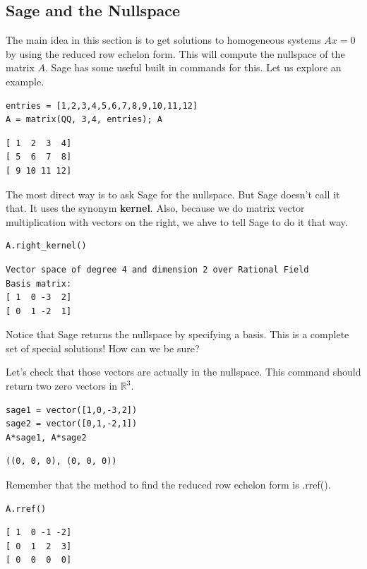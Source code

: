 \documentclass[10pt,]{book}
\newcommand{\terminology}[1]{\textbf{#1}}
\theoremstyle{plain}
\numberwithin{equation}{section}
\begin{document}
\subsection[Sage and the Nullspace]{Sage and the Nullspace}\label{subsection-66}

      The main idea in this section is to get solutions to homogeneous
      systems \(Ax=0\) by using the reduced row echelon form. This will
      compute the nullspace of the matrix \(A\). Sage has some useful built
      in commands for this. Let us explore an example.
\begin{lstlisting}[style=sageinput]
entries = [1,2,3,4,5,6,7,8,9,10,11,12]
A = matrix(QQ, 3,4, entries); A
\end{lstlisting}
\begin{lstlisting}[style=sageoutput]
[ 1  2  3  4]
[ 5  6  7  8]
[ 9 10 11 12]
\end{lstlisting}
\par

      The most direct way is to ask Sage for the nullspace. But Sage doesn't
      call it that. It uses the synonym \terminology{kernel}. Also, because we
      do matrix vector multiplication with vectors on the right, we ahve to
      tell Sage to do it that way.
\begin{lstlisting}[style=sageinput]
A.right_kernel()
\end{lstlisting}
\begin{lstlisting}[style=sageoutput]
Vector space of degree 4 and dimension 2 over Rational Field
Basis matrix:
[ 1  0 -3  2]
[ 0  1 -2  1]
\end{lstlisting}
\par

      Notice that Sage returns the nullspace by specifying a basis. This is
      a complete set of special solutions! How can we be sure?
\par

      Let's check that those vectors are actually in the nullspace. This command
      should return two zero vectors in \(\mathbb{R}^3\).
\begin{lstlisting}[style=sageinput]
sage1 = vector([1,0,-3,2])
sage2 = vector([0,1,-2,1])
A*sage1, A*sage2
\end{lstlisting}
\begin{lstlisting}[style=sageoutput]
((0, 0, 0), (0, 0, 0))
\end{lstlisting}
\par

      Remember that the method to find the reduced row
      echelon form is .rref().
\begin{lstlisting}[style=sageinput]
A.rref()
\end{lstlisting}
\begin{lstlisting}[style=sageoutput]
[ 1  0 -1 -2]
[ 0  1  2  3]
[ 0  0  0  0]
\end{lstlisting}
\par
\end{document}
